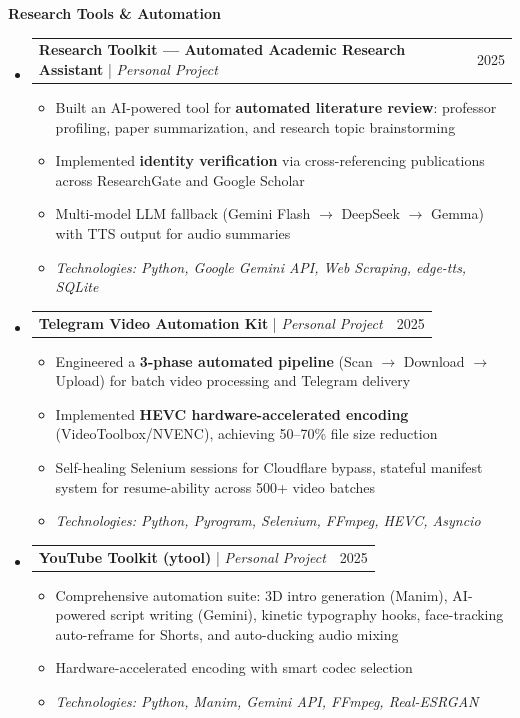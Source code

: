 \documentclass[11pt,a4paper]{article}
\makeatletter
\newcommand{\subspace}{\vspace{0.5em}}
\newcommand{\cvsubsection}[1]{
    \subspace
    \noindent\textcolor{primary}{\large \textbf{#1}}
    \par\vspace{0.3em}
}
\newcommand{\headerrow}[2]{
    \begin{tabular*}{\linewidth}{l@{\extracolsep{\fill}}r}
    #1 & \textcolor{primary}{#2} \\
    \end{tabular*}
}
\makeatother
\begin{document}
\cvsubsection{Research Tools \& Automation}
\begin{itemize}[leftmargin=1em, label={}]
    \item
    \headerrow{\textbf{Research Toolkit — Automated Academic Research Assistant} | \emph{Personal Project}}{2025}
    \begin{itemize}[leftmargin=1.5em, label=$\bullet$, nosep]
        \item Built an AI-powered tool for \textbf{automated literature review}: professor profiling, paper summarization, and research topic brainstorming
        \item Implemented \textbf{identity verification} via cross-referencing publications across ResearchGate and Google Scholar
        \item Multi-model LLM fallback (Gemini Flash $\rightarrow$ DeepSeek $\rightarrow$ Gemma) with TTS output for audio summaries
        \item \emph{Technologies: Python, Google Gemini API, Web Scraping, edge-tts, SQLite}
    \end{itemize}

    \subspace 
    \item
    \headerrow{\textbf{Telegram Video Automation Kit} | \emph{Personal Project}}{2025}
    \begin{itemize}[leftmargin=1.5em, label=$\bullet$, nosep]
        \item Engineered a \textbf{3-phase automated pipeline} (Scan $\rightarrow$ Download $\rightarrow$ Upload) for batch video processing and Telegram delivery
        \item Implemented \textbf{HEVC hardware-accelerated encoding} (VideoToolbox/NVENC), achieving 50--70\% file size reduction
        \item Self-healing Selenium sessions for Cloudflare bypass, stateful manifest system for resume-ability across 500+ video batches
        \item \emph{Technologies: Python, Pyrogram, Selenium, FFmpeg, HEVC, Asyncio}
    \end{itemize}

    \subspace 
    \item
    \headerrow{\textbf{YouTube Toolkit (ytool)} | \emph{Personal Project}}{2025}
    \begin{itemize}[leftmargin=1.5em, label=$\bullet$, nosep]
        \item Comprehensive automation suite: 3D intro generation (Manim), AI-powered script writing (Gemini), kinetic typography hooks, face-tracking auto-reframe for Shorts, and auto-ducking audio mixing
        \item Hardware-accelerated encoding with smart codec selection
        \item \emph{Technologies: Python, Manim, Gemini API, FFmpeg, Real-ESRGAN}
    \end{itemize}


\end{itemize}
\end{document}
